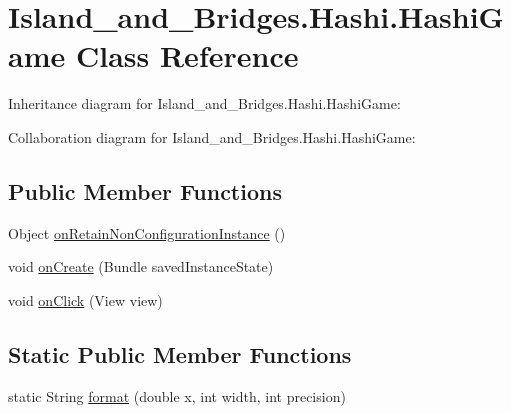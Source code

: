 \hypertarget{class_island__and___bridges_1_1_hashi_1_1_hashi_game}{}\section{Island\+\_\+and\+\_\+\+Bridges.\+Hashi.\+Hashi\+Game Class Reference}
\label{class_island__and___bridges_1_1_hashi_1_1_hashi_game}


Inheritance diagram for Island\+\_\+and\+\_\+\+Bridges.\+Hashi.\+Hashi\+Game\+:


Collaboration diagram for Island\+\_\+and\+\_\+\+Bridges.\+Hashi.\+Hashi\+Game\+:
\subsection*{Public Member Functions}
\begin{DoxyCompactItemize}
\item 
Object \mbox{\hyperlink{class_island__and___bridges_1_1_hashi_1_1_hashi_game_ac96237f078bdcf868a0004df3190ebaf}{on\+Retain\+Non\+Configuration\+Instance}} ()
\item 
void \mbox{\hyperlink{class_island__and___bridges_1_1_hashi_1_1_hashi_game_aee401fb6e2e4e14715dc1adf9b1630d0}{on\+Create}} (Bundle saved\+Instance\+State)
\item 
void \mbox{\hyperlink{class_island__and___bridges_1_1_hashi_1_1_hashi_game_a6beca08295abc726b1f9228fdbef7645}{on\+Click}} (View view)
\end{DoxyCompactItemize}
\subsection*{Static Public Member Functions}
\begin{DoxyCompactItemize}
\item 
static String \mbox{\hyperlink{class_island__and___bridges_1_1_hashi_1_1_hashi_game_a5a106d9c7bc38b14c537607140fecaae}{format}} (double x, int width, int precision)
\end{DoxyCompactItemize}
